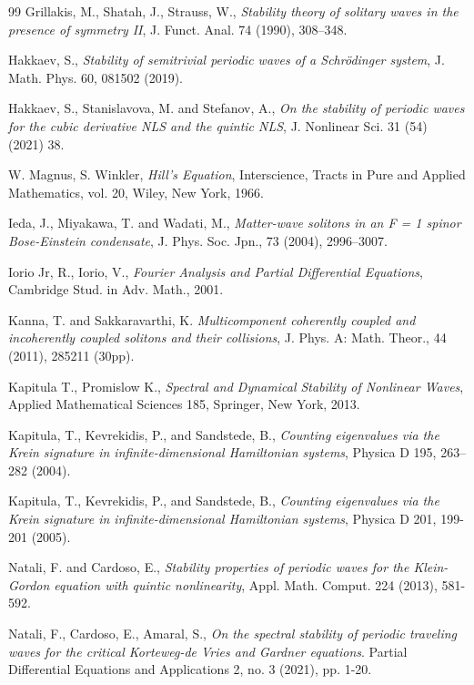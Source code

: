 \documentclass[10pt,reqno,a4paper]{amsart} %
\theoremstyle{definition} %
\numberwithin{equation}{section}
\numberwithin{figure}{section}
\begin{document}
\begin{thebibliography}{99}
 Grillakis, M., Shatah, J., Strauss, W.,\textit{ Stability theory of solitary waves in the presence of symmetry II}, J. Funct. Anal. 74 (1990), 308--348.




 Hakkaev, S., \textit{Stability of semitrivial periodic waves of a Schrödinger system}, J. Math. Phys. 60, 081502 (2019).


 Hakkaev, S.,  Stanislavova, M. and Stefanov, A., \textit{On the stability of periodic waves for the cubic derivative NLS and the quintic NLS}, J. Nonlinear Sci. 31 (54) (2021) 38.


 W. Magnus, S. Winkler, \textit{Hill’s Equation}, Interscience, Tracts in Pure and Applied Mathematics, vol. 20, Wiley, New York, 1966.


 Ieda, J., Miyakawa, T. and Wadati, M., \textit{Matter-wave solitons in an F = 1
	spinor Bose-Einstein condensate}, J. Phys. Soc. Jpn., 73 (2004), 2996–3007.

 Iorio Jr, R., Iorio, V., \textit{ Fourier Analysis and Partial Differential Equations}, Cambridge Stud. in Adv. Math., 2001.

 Kanna, T. and  Sakkaravarthi, K. \textit{Multicomponent coherently coupled and incoherently coupled solitons and their collisions}, J. Phys. A: Math.
Theor., 44 (2011), 285211 (30pp).

 Kapitula T., Promislow K., \textit{Spectral and Dynamical Stability of Nonlinear Waves},  Applied Mathematical Sciences 185, Springer, New York, 2013.


 Kapitula, T., Kevrekidis, P., and Sandstede, B., \textit{Counting eigenvalues via the Krein signature in infinite-dimensional Hamiltonian systems}, Physica D 195, 263–282 (2004).

 Kapitula, T., Kevrekidis, P., and Sandstede, B., \textit{Counting eigenvalues via the Krein signature in infinite-dimensional Hamiltonian systems}, Physica D 201, 199-201 (2005).



 Natali, F. and Cardoso, E., \textit{Stability properties of periodic waves for the Klein-Gordon equation with quintic nonlinearity}, Appl. Math. Comput. 224 (2013), 581-592.

 Natali, F., Cardoso, E., Amaral, S., \textit{On the spectral stability of periodic traveling waves for the critical Korteweg-de Vries and Gardner equations}. Partial Differential Equations and Applications 2, no. 3 (2021), pp. 1-20.


\end{thebibliography}
\end{document}
